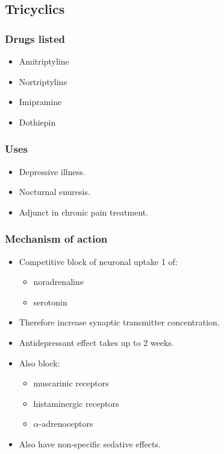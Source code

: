 \documentclass[11pt,a4paper]{article}
\begin{document}
\subsection{Tricyclics}

\subsubsection{Drugs listed}
\begin{itemize}
  \item Amitriptyline
  \item Nortriptyline
  \item Imipramine
  \item Dothiepin
\end{itemize}

\subsubsection{Uses}
\begin{itemize}
  \item Depressive illness.
  \item Nocturnal enuresis.
  \item Adjunct in chronic pain treatment.
\end{itemize}

\subsubsection{Mechanism of action}
\begin{itemize}
  \item Competitive block of neuronal uptake 1 of:
  \begin{itemize}
    \item noradrenaline
    \item serotonin
  \end{itemize}
  \item Therefore increase synaptic transmitter concentration.
  \item Antidepressant effect takes up to 2 weeks.
  \item Also block:
  \begin{itemize}
    \item muscarinic receptors
    \item histaminergic receptors
    \item $\alpha$-adrenoceptors
  \end{itemize}
  \item Also have non-specific sedative effects.
\end{itemize}
\end{document}
